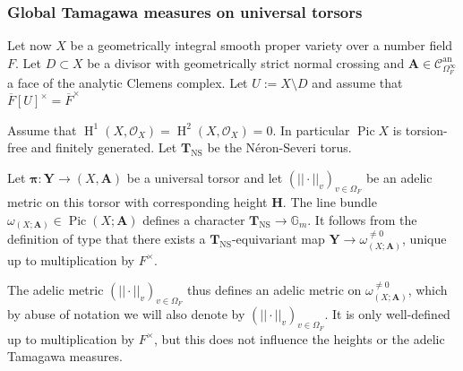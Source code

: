 \documentclass[a4paper,11pt,reqno]{amsart}
\newcommand{\G}{\mathbb{G}}
\DeclareMathOperator{\Pic}{Pic}
\DeclareMathOperator{\NS}{NS}
\DeclareMathOperator{\HH}{H}
\DeclareMathOperator{\an}{an}
\theoremstyle{definition}
\begin{document}
\subsubsection{Global Tamagawa measures on universal torsors}\label{section:Tamagawa measures global}
Let now $X$ be a geometrically integral smooth proper variety over a number field $F$. Let $D \subset X$ be a divisor with geometrically strict normal crossing and $\mathbf{A} \in \mathcal{C}^{\an}_{\Omega_{F}^{\infty}}$ a face of the analytic Clemens complex. Let $U := X \setminus D$ and assume that $\overline{F}[U]^{\times} = \overline{F}^{\times}$

Assume that $\HH^1(X, \mathcal{O}_X) = \HH^2(X, \mathcal{O}_X) = 0$. In particular $\Pic X$ is torsion-free and finitely generated. Let $\mathbf{T}_{\NS}$ be the N\'eron-Severi torus.

Let $\bm{\pi}:\mathbf{Y} \to (X, \mathbf{A})$ be a universal torsor and let $(||\cdot||_v)_{v \in \Omega_F}$ be an adelic metric on this torsor with corresponding height $\mathbf{H}$. The line bundle $\omega_{(X; \mathbf{A})} \in \Pic (X ; \mathbf{A})$ defines a character $\mathbf{T}_{\NS} \to \G_m$. It follows from the definition of type that there exists a $\mathbf{T}_{\NS}$-equivariant map $\mathbf{Y} \to \omega_{(X; \mathbf{A})}^{\neq 0}$, unique up to multiplication by $F^{\times}$.

The adelic metric $(||\cdot||_v)_{v \in \Omega_F}$ thus defines an adelic metric on $ \omega_{(X; \mathbf{A})}^{\neq 0}$, which by abuse of notation we will also denote by $(||\cdot||_v)_{v \in \Omega_F}$. It is only well-defined up to multiplication by $F^{\times}$, but this does not influence the heights or the adelic Tamagawa measures. 
\end{document}
